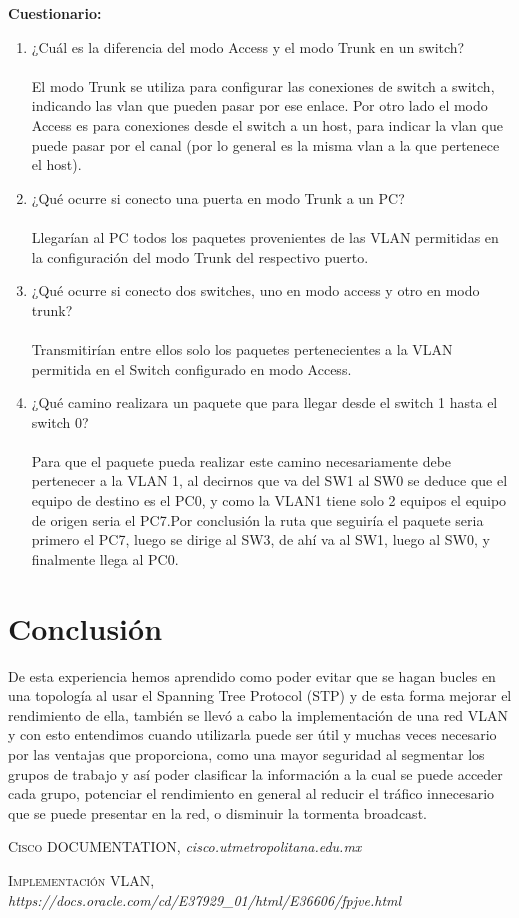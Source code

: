 \documentclass{udpreport}
\begin{document}
	
	{\large \bf{Cuestionario: }}\\
	\begin{enumerate}
	    \item ¿Cuál es la diferencia del modo Access y el modo Trunk en un switch?\\\\
	         El modo Trunk se utiliza para configurar las conexiones de switch a switch, indicando las vlan que pueden pasar por ese enlace. Por otro lado el modo Access es para conexiones desde el switch a un host, para indicar la vlan que puede pasar por el canal (por lo general es la misma vlan a la que pertenece el host).
        \item  ¿Qué ocurre si conecto una puerta en modo Trunk a un PC?\\\\
            Llegarían al PC todos los paquetes provenientes de las VLAN permitidas en la configuración del modo Trunk del respectivo puerto.
        \item ¿Qué ocurre si conecto dos switches, uno en modo access y otro en modo trunk?\\\\
              Transmitirían entre ellos solo los paquetes pertenecientes a la VLAN 
  	      permitida en el Switch configurado en modo Access.
  	     \item  ¿Qué camino realizara un paquete que para llegar desde el switch 1 hasta el switch 0?\\\\
  	        Para que el paquete pueda realizar este camino necesariamente debe pertenecer a la VLAN 1, al decirnos que va del SW1 al SW0 se deduce que el equipo de destino es el PC0, y como la VLAN1 tiene solo 2 equipos el equipo de origen seria el PC7.Por conclusión la ruta que seguiría el paquete seria primero el PC7, luego se dirige al SW3, de ahí va al SW1, luego al SW0, y finalmente llega al PC0.
  	     
	\end{enumerate}
\chapter{Conclusión}
 De esta experiencia hemos aprendido como poder evitar que se hagan bucles en una topología al usar el Spanning Tree Protocol (STP) y de esta forma mejorar el rendimiento de ella, también se llevó a cabo la implementación de una red VLAN y con esto entendimos cuando utilizarla puede ser útil y muchas veces necesario por las ventajas que proporciona, como una mayor seguridad al segmentar los grupos de trabajo y así poder clasificar la información a la cual se puede acceder cada grupo, potenciar el rendimiento en general al reducir el tráfico innecesario que se puede presentar en la red, o disminuir la tormenta broadcast.\\
\begin{thebibliography}{x}
 \textsc{Cisco DOCUMENTATION},
\textit{cisco.utmetropolitana.edu.mx}

 \textsc{Implementación VLAN},
\textit{https://docs.oracle.com/cd/E37929_01/html/E36606/fpjve.html}

\end{thebibliography}
\end{document}
